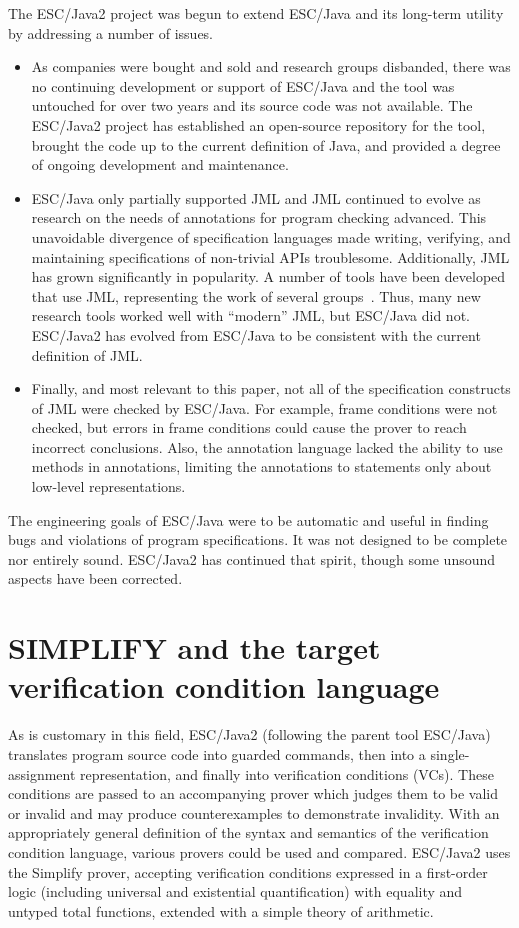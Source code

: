 \documentclass{sig-alternate}
\begin{document}
The ESC/Java2 project \cite{CokKiniry04} was begun to extend ESC/Java
and its long-term utility by addressing a number of issues.
\begin{itemize}
\setlength{\itemsep}{0in}
\setlength{\parsep}{0in}
\item As companies were bought and sold and research groups
disbanded, there was no continuing development or support of 
ESC/Java and the tool was untouched for over two years and its
source code was not available.  The ESC/Java2 project has established
an open-source repository for the tool, brought the code up to the current
definition of Java, and provided a degree of ongoing development and
maintenance.
\item  ESC/Java only partially supported JML and JML continued to evolve as
research on the needs of annotations for program checking advanced.
This unavoidable divergence of specification languages made writing,
verifying, and maintaining specifications of non-trivial APIs
troublesome.
Additionally, JML has grown significantly in popularity.  A number of
tools have been developed that use JML, representing the work of several
groups~\cite{jmlpapers,Burdy-etal03,Leavens-etal00,NimmerErnst01,Bogor03,BergJ01}.
Thus, many new research tools worked well with ``modern'' JML, but
ESC/Java did not.  ESC/Java2 has evolved from ESC/Java to be
consistent with the current definition of JML.
\item Finally, and most relevant to this paper,
not all of the specification constructs of JML were checked by ESC/Java.  For
example, frame conditions were not checked, but errors in frame
conditions could cause the prover to reach incorrect conclusions.
Also, the annotation language lacked the ability to use methods in
annotations, limiting the annotations to statements only about
low-level representations.
\end{itemize}

The engineering goals of ESC/Java were to be automatic and useful in finding bugs
and violations of program specifications.  It was not designed to be complete nor
entirely sound.  ESC/Java2 has continued that spirit, though some unsound aspects have
been corrected.

\section{SIMPLIFY and the target verification condition language}

As is customary in this field, ESC/Java2 (following the parent tool ESC/Java) translates program source code into guarded commands, then into a single-assignment representation, and 
finally
into verification conditions (VCs).  These conditions are passed to an accompanying prover which
judges them to be valid or invalid and may produce counterexamples to demonstrate
invalidity.  With an appropriately general definition of the syntax and semantics of the verification
condition language, various provers could be used and compared.  ESC/Java2 uses the
Simplify \cite{nelson80,simplify} prover, accepting verification conditions expressed in a
first-order logic (including universal and existential quantification) with equality and untyped total
functions, extended with a simple theory of arithmetic.
\end{document}
